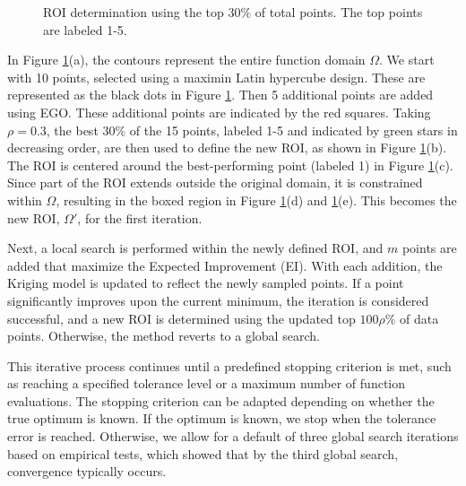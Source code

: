 \documentclass [PhD] {package/uclathes}
\begin{document}
\begin{figure}
    \quad
    \caption{ROI determination using the top \(30\%\) of total points. The {top}  points are labeled 1-5.}
    \label{fig:roi}%
\end{figure}


In Figure \ref{fig:roi}(a), the contours represent the entire function domain \(\Omega\). We start with 10 points, selected using a maximin Latin hypercube design. These are represented as the black dots in Figure \ref{fig:roi}. Then 5 additional points are added using EGO. These additional points are indicated by the red squares. Taking $\rho=0.3$, the best $30\%$ of the 15 points, labeled 1-5 and indicated by green stars in decreasing order, are then used to define the new ROI, as shown in Figure \ref{fig:roi}(b). The ROI is centered around the best-performing point (labeled 1) in Figure \ref{fig:roi}(c). Since part of the ROI extends outside the original domain, it is constrained within \(\Omega\), resulting in the boxed region in Figure \ref{fig:roi}(d) and \ref{fig:roi}(e). This becomes the new ROI, \(\Omega'\), for the first iteration.

Next, a local search is performed within the newly defined ROI, and $m$ points are added that maximize the Expected Improvement (EI). With each addition, the Kriging model is updated to reflect the newly sampled points. If a point significantly improves upon the current minimum, the iteration is considered successful, and a new ROI is determined using the updated top $100\rho\%$ of data points. Otherwise, the method reverts to a global search.

This iterative process continues until a predefined stopping criterion is met, such as reaching a specified tolerance level or a maximum number of function evaluations. The stopping criterion can be adapted depending on whether the true optimum is known. If the optimum is known, we stop when the tolerance error is reached. Otherwise, we allow for a default of three global search iterations based on empirical tests, which showed that by the third global search, convergence typically occurs.
\end{document}
